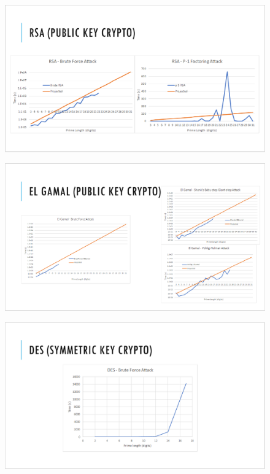\documentclass[12pt]{report}
\begin{document}
\begin{figure}[hp!] %
    \begin{center}
        \includegraphics[width=0.85\linewidth]{slide5.PNG}
        \label{fig:slide5}
    \end{center}
\end{figure}

\begin{figure}[hp!] %
    \begin{center}
        \includegraphics[width=0.85\linewidth]{slide6.PNG}
        \label{fig:slide6}
    \end{center}
\end{figure}

\begin{figure}[hp!] %
    \begin{center}
        \includegraphics[width=0.85\linewidth]{slide7.PNG}
        \label{fig:slide7}
    \end{center}
\end{figure}
\end{document}

